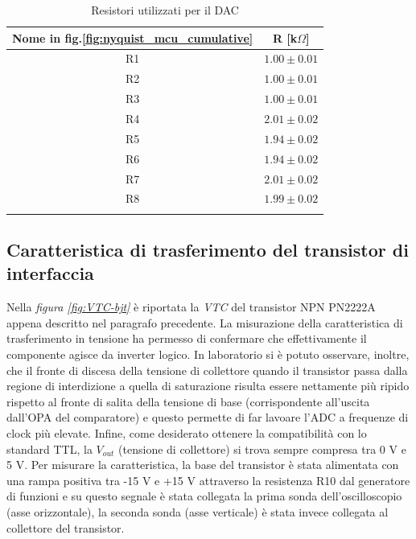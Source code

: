 \documentclass[journal]{IEEEtran}
\begin{document}
\begin{table}[H]
\begin{center}
\caption{Resistori utilizzati per il DAC}
\begin{tabular}{|c|c|}
\hline
Nome in fig.\ref{fig:nyquist_mcu_cumulative} & R [k$\Omega $] \\ \hline
R1  & $1.00 \pm 0.01$ \\
R2  & $1.00 \pm 0.01$ \\
R3  & $1.00 \pm 0.01$ \\
R4  & $2.01 \pm 0.02$ \\
R5  & $1.94 \pm 0.02$ \\
R6  & $1.94 \pm 0.02$ \\
R7  & $2.01 \pm 0.02$ \\
R8  & $1.99 \pm 0.02$ \\ \hline 
\label{tab:resistori_dac}
\end{tabular}
\end{center}
\end{table}


\subsection{Caratteristica di trasferimento del transistor di interfaccia}
Nella \textit{figura \ref{fig:VTC-bjt}} è riportata la \textit{VTC} del transistor NPN PN2222A appena descritto nel paragrafo precedente. La misurazione della caratteristica di trasferimento in tensione ha permesso di confermare che effettivamente il componente agisce da inverter logico. In laboratorio si è potuto osservare, inoltre, che il fronte di discesa della tensione di collettore quando il transistor passa dalla regione di interdizione a quella di saturazione risulta essere nettamente più ripido rispetto al fronte di salita della tensione di base (corrispondente all'uscita dall'OPA del comparatore) e questo permette di far lavoare l'ADC a frequenze di clock più elevate. Infine, come desiderato ottenere la compatibilità con lo standard TTL, la $V_{out}$ (tensione di collettore) si trova sempre compresa tra 0 V e 5 V. Per misurare la caratteristica, la base del transistor è stata alimentata con una rampa positiva tra -15 V e +15 V attraverso la resistenza R10 dal generatore di funzioni e su questo segnale è stata collegata la prima sonda dell'oscilloscopio (asse orizzontale), la seconda sonda (asse verticale) è stata invece collegata al collettore del transistor.
\end{document}
